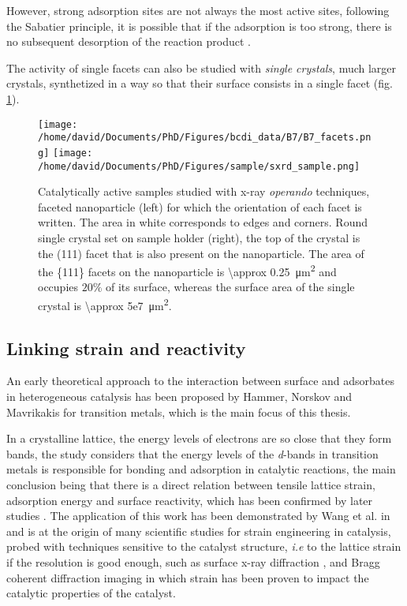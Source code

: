 However, strong adsorption sites are not always the most active sites, following the Sabatier principle, it is possible that if the adsorption is too strong, there is no subsequent desorption of the reaction product \parencite{Nilsson2005, Jiang2009}.

The activity of single facets can also be studied with \textit{single crystals}, much larger crystals, synthetized in a way so that their surface consists in a single facet (fig. \ref{fig:Samples}).

\begin{figure}[!htb]
    \centering
    \texttt{[image: /home/david/Documents/PhD/Figures/bcdi\_data/B7/B7\_facets.png]}
    \texttt{[image: /home/david/Documents/PhD/Figures/sample/sxrd\_sample.png]}
    \caption{
        Catalytically active samples studied with x-ray \textit{operando} techniques, faceted nanoparticle (left) for which the orientation of each facet is written.
        The area in white corresponds to edges and corners.
        Round single crystal set on sample holder (right), the top of the crystal is the (111) facet that is also present on the nanoparticle.
        The area of the \{111\} facets on the nanoparticle is \qty{\approx 0.25}{\um^2} and occupies $20 \%$ of its surface, whereas the surface area of the single crystal is \qty{\approx 5e7}{\um^2}.
    }
    \label{fig:Samples}
\end{figure}

\subsection{Linking strain and reactivity}

An early theoretical approach to the interaction between surface and adsorbates in heterogeneous catalysis has been proposed by Hammer, Norskov and Mavrikakis \parencite*{Hammer1995, Mavrikakis1998, Hammer2000} for transition metals, which is the main focus of this thesis.

In a crystalline lattice, the energy levels of electrons are so close that they form bands, the study considers that the energy levels of the \textit{d}-bands in transition metals is responsible for bonding and adsorption in catalytic reactions, the main conclusion being that there is a direct relation between tensile lattice strain, adsorption energy and surface reactivity, which has been confirmed by later studies \parencite{Kitchin2004, Kibler2005, Ontaneda2015}.
The application of this work has been demonstrated by Wang et al. in \cite*{Wang2016} and is at the origin of many scientific studies for strain engineering in catalysis, probed with techniques sensitive to the catalyst structure, \textit{i.e} to the lattice strain if the resolution is good enough, such as surface x-ray diffraction \parencite{Resta2020a}, and Bragg coherent diffraction imaging \parencite{Sneed2015, ulvestad_situ_2016, Kim2019, Bjorling2019, Passos2020, Carnis2021a, Carnis2021b, Dupraz2022} in which strain has been proven to impact the catalytic properties of the catalyst.

